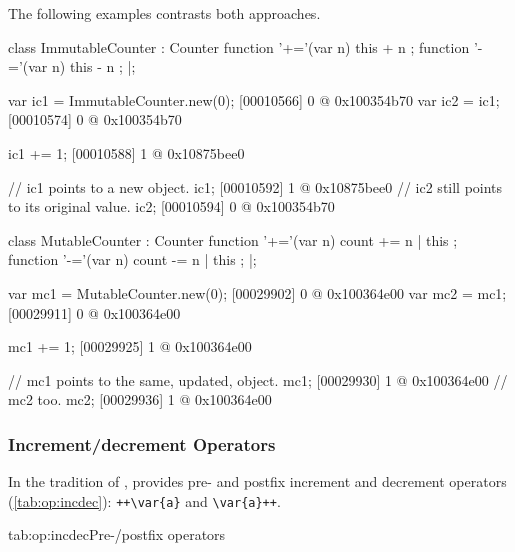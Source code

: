 The following examples contrasts both approaches.

\begin{multicols}{2}
\begin{urbiscript}[xrightmargin=0mm,xleftmargin=0mm]
class ImmutableCounter : Counter
{
  function '+='(var n) { this + n };
  function '-='(var n) { this - n };
}|;

var ic1 = ImmutableCounter.new(0);
[00010566] 0 @ 0x100354b70
var ic2 = ic1;
[00010574] 0 @ 0x100354b70

ic1 += 1;
[00010588] 1 @ 0x10875bee0

// ic1 points to a new object.
ic1;
[00010592] 1 @ 0x10875bee0
// ic2 still points to its original value.
ic2;
[00010594] 0 @ 0x100354b70
\end{urbiscript}
\columnbreak
\begin{urbiscript}[xrightmargin=0mm,xleftmargin=0mm]
class MutableCounter : Counter
{
  function '+='(var n) { count += n | this };
  function '-='(var n) { count -= n | this };
}|;

var mc1 = MutableCounter.new(0);
[00029902] 0 @ 0x100364e00
var mc2 = mc1;
[00029911] 0 @ 0x100364e00

mc1 += 1;
[00029925] 1 @ 0x100364e00

// mc1 points to the same, updated, object.
mc1;
[00029930] 1 @ 0x100364e00
// mc2 too.
mc2;
[00029936] 1 @ 0x100364e00
\end{urbiscript}
\end{multicols}

\subsubsection{Increment/decrement Operators}
\label{sec:lang:op:incdec}

In the tradition of \langC, \us provides pre- and postfix increment and
decrement operators (\autoref{tab:op:incdec}): \lstinline|++\var{a}| and
\lstinline|\var{a}++|.

\begin{operatorTable}{tab:op:incdec}{Pre-/postfix operators}
  \operatorinca\\\operatordeca\\\operatorainc\\\operatoradec
\end{operatorTable}

